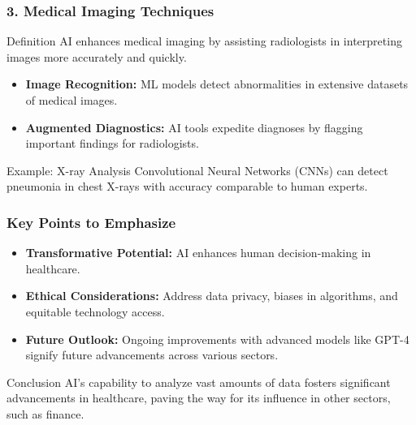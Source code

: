 \documentclass[aspectratio=169]{beamer}
\begin{document}
\begin{frame}[fragile]
  \frametitle{3. Medical Imaging Techniques}
  \begin{block}{Definition}
      AI enhances medical imaging by assisting radiologists in interpreting images more accurately and quickly.
  \end{block}
  
  \begin{itemize}
      \item \textbf{Image Recognition:} ML models detect abnormalities in extensive datasets of medical images.
      \item \textbf{Augmented Diagnostics:} AI tools expedite diagnoses by flagging important findings for radiologists.
  \end{itemize}

  \pause
  
  \begin{block}{Example: X-ray Analysis}
      Convolutional Neural Networks (CNNs) can detect pneumonia in chest X-rays with accuracy comparable to human experts.
  \end{block}
\end{frame}

\begin{frame}[fragile]
  \frametitle{Key Points to Emphasize}
  \begin{itemize}
      \item \textbf{Transformative Potential:} AI enhances human decision-making in healthcare.
      \item \textbf{Ethical Considerations:} Address data privacy, biases in algorithms, and equitable technology access.
      \item \textbf{Future Outlook:} Ongoing improvements with advanced models like GPT-4 signify future advancements across various sectors.
  \end{itemize}
  
  \begin{block}{Conclusion}
      AI's capability to analyze vast amounts of data fosters significant advancements in healthcare, paving the way for its influence in other sectors, such as finance.
  \end{block}
\end{frame}
\end{document}
